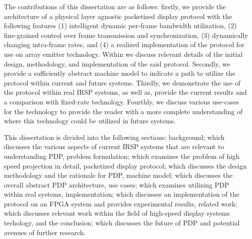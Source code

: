 The contributions of this dissertation are as follows: firstly, we provide the architecture of a physical layer agnostic packetized display protocol with the following features (1) intelligent dynamic per-frame bandwidth utilization, (2) fine-grained control over frame transmission and synchronization, (3) dynamically changing intra-frame rates, and (4) a realized implementation of the protocol for use on array emitter technology. Within we discuss relevant details of the initial design, methodology, and implementation of the said protocol. Secondly, we provide a sufficiently abstract machine model to indicate a path to utilize the protocol within current and future systems. Thirdly, we demonstrate the use of the protocol within real IRSP systems, as well as, provide the current results and a comparison with fixed-rate technology. Fourthly, we discuss various use-cases for the technology to provide the reader with a more complete understanding of where this technology could be utilized in future systems.

This dissertation is divided into the following sections: background; which discusses the various aspects of current IRSP systems that are relevant to understanding PDP, problem formulation; which examines the problem of high speed projection in detail, packetized display protocol; which discusses the design methodology and the rationale for PDP, machine model; which discusses the overall abstract PDP architecture, use cases; which examines utilizing PDP within real systems, implementation; which discusses an implementation of the protocol on an FPGA system and provides experimental results, related work; which discusses relevant work within the field of high-speed display systems techology, and the conclusion; which discusses the future of PDP and potential avenues of further research.
